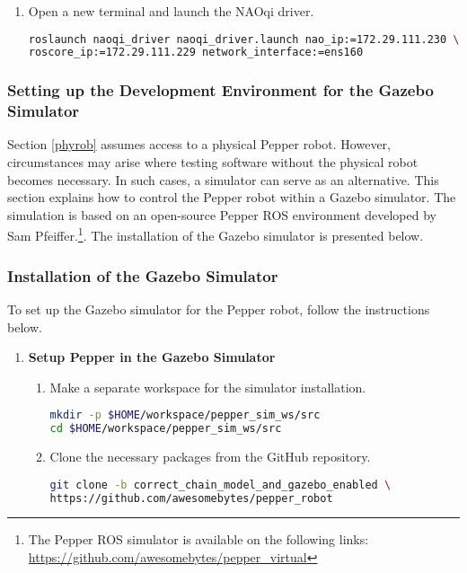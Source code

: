 \documentclass{CSSRforAfrica}
\begin{document}
{{\begin{enumerate}
\item Open a new terminal and launch the NAOqi driver.
\begin{lstlisting}[style=withoutNumbering, language=bash]
roslaunch naoqi_driver naoqi_driver.launch nao_ip:=172.29.111.230 \
roscore_ip:=172.29.111.229 network_interface:=ens160
\end{lstlisting} 
\end{enumerate}
}

\subsubsection{Setting up the Development Environment for the Gazebo Simulator}
\label{simulator}
Section \ref{phyrob} assumes access to a physical Pepper robot. However, circumstances may arise where testing software without the physical robot becomes necessary. In such cases, a simulator can serve as an alternative. This section explains how to control the Pepper robot within a Gazebo simulator. The simulation is based on an open-source Pepper ROS environment developed by Sam Pfeiffer.\footnote{The Pepper ROS simulator is available on the following links: \url{https://github.com/awesomebytes/pepper\_virtual}}. The installation of the Gazebo simulator is presented below.

\subsubsection*{Installation of the Gazebo Simulator}
To set up the Gazebo simulator for the Pepper robot, follow the instructions below.

\begin{enumerate}
\item \textbf{Setup Pepper in the Gazebo Simulator}
\begin{enumerate}
\item Make a separate workspace for the simulator installation.
\begin{lstlisting}[style=withoutNumbering, language=bash]
mkdir -p $HOME/workspace/pepper_sim_ws/src
cd $HOME/workspace/pepper_sim_ws/src
\end{lstlisting} 

\item Clone the necessary packages from the GitHub repository.
\begin{lstlisting}[style=withoutNumbering, language=bash]
git clone -b correct_chain_model_and_gazebo_enabled \
https://github.com/awesomebytes/pepper_robot
\end{lstlisting} 


\end{enumerate}
\end{enumerate}}
\end{document}
